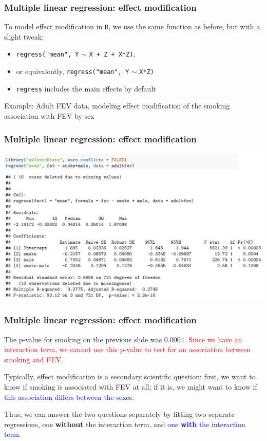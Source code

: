\documentclass[12pt, 
hyperref={colorlinks=true, linkcolor=blue, urlcolor=cyan},dvipsnames]{beamer}
\begin{document}
\begin{frame}
\frametitle{Multiple linear regression: effect modification}

To model effect modification in \texttt{R}, we use the same function as before, but with a slight tweak:
\begin{itemize}
\item \texttt{regress("mean", Y} $\sim$ \texttt{X + Z + X*Z)}, 
\item or equivalently, \texttt{regress("mean", Y} $\sim$ \texttt{X*Z)}
\item[] {\small \texttt{regress} includes the main effects by default }
\end{itemize}

Example: Adult FEV data, modeling effect modification of the smoking association with FEV by sex
\end{frame}

\begin{frame}
\frametitle{Multiple linear regression: effect modification}
\vspace{-1cm}\hspace*{-0.5cm}
\includegraphics[width=1.1\textwidth]{plots/fev_smoke_sex_em.png}

\end{frame}

\begin{frame}
\frametitle{Multiple linear regression: effect modification}

The p-value for smoking on the previous slide was 0.0004. \textcolor{red}{Since we have an interaction term, we cannot use this p-value to test for an association between smoking and FEV}.

Typically, effect modification is a secondary scientific question: first, we want to know if smoking is associated with FEV at all; if it is, we might want to know \textcolor{blue}{if this association differs between the sexes}.

Thus, we can answer the two questions separately by fitting two separate regressions, one \textbf{without} the interaction term, and \textcolor{blue}{one \textbf{with} the interaction term}. 
\end{frame}
\end{document}
